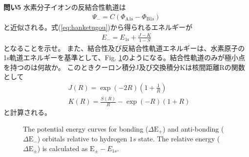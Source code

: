 \documentclass[11pt,pra,aps]{revtex4}
\begin{document}

\noindent
{\bf 問い5}
水素分子イオンの反結合性軌道は
\begin{align}
  \Psi_{-}=C(\Phi_\text{A1s}-\Phi_\text{B1s})\label{eq:hanketugou}
\end{align}
と近似される。式(\ref{eq:hanketugou})から得られるエネルギーが
\begin{align}
  E_-=E_\text{1s}+\frac{J-K}{1-S}  
\end{align}
となることを示せ。
また、結合性及び反結合性軌道エネルギーは、水素原子の1s軌道エネルギーを基準として、Fig. \ref{fig:suiso}のようになる。結合性軌道のみが極小点を持つのは何故か。
このときクーロン積分J及び交換積分Kは核間距離Rの関数として
\begin{align}
  &J(R)=\exp(-2R)\left(1+\frac{1}{R}\right) \label{eq:J} \\
  &K(R)=\frac{S(R)}{R}-\exp(-R)\left(1+R\right) \label{eq:K}
\end{align}
と計算される。
{
  \begin{figure}[H]
    \begin{center}
    \caption{\label{fig:suiso}
      {
        The potential energy curves for bonding ($\Delta \text{E}_+$) and anti-bonding ($\Delta \text{E}_-$) orbitals relative to hydrogen $1s$ state. The relative energy ($\Delta \text{E}_{\pm}$) is calculated as $\text{E}_{\pm} - E_{1s}$.
      }
    }
    \end{center}
  \end{figure}
}
\end{document}
